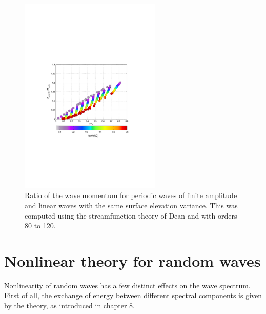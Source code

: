 \begin{figure}
\centerline{\includegraphics[width=0.6\textwidth]{FIGS_CH_NONLIN/MW_Mwlin.pdf}}
\caption{Ratio of the wave momentum for periodic waves of finite amplitude and linear waves with the same surface elevation variance. This was computed 
using the streamfunction theory of Dean and \cite{Dalrymple1974} with orders 80 to 120.} \label{Mwfig}
\end{figure}




\section{Nonlinear theory for random waves}\label{ch_nonlin_alea}
Nonlinearity of random waves has a few distinct effects on the wave spectrum. First of all, the exchange of
energy between different spectral components is given by the  \cite{Hasselmann1960} theory, as introduced 
in chapter 8. %


